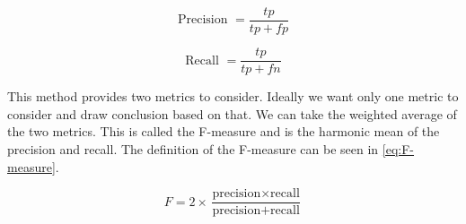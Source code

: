 \begin{equation}
	\label{eq:precision}
	\text{Precision } = \frac{tp}{tp + fp}
\end{equation}

\begin{equation}
	\label{eq:recall}
	\text{Recall } = \frac{tp}{tp + fn}
\end{equation}

This method provides two metrics to consider.
Ideally we want only one metric to consider and draw conclusion based on that.
We can take the weighted average of the two metrics.
This is called the F-measure \cite{sokolova2009systematic} and is the harmonic mean of the precision and recall.
The definition of the F-measure can be seen in \autoref{eq:F-measure}.

\begin{equation}
	\label{eq:F-measure}
	F = 2 \times \frac{\text{precision} \times \text{recall}}{\text{precision} + \text{recall}}
\end{equation}













